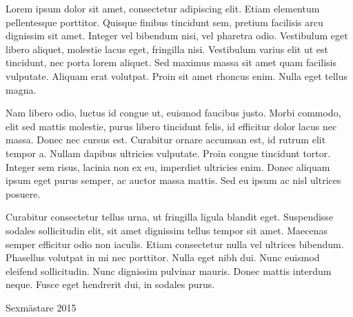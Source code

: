 \documentclass[../_main/handlingar.tex]{subfiles}
\begin{document}

Lorem ipsum dolor sit amet, consectetur adipiscing elit. Etiam elementum pellentesque porttitor. Quisque finibus tincidunt sem, pretium facilisis arcu dignissim sit amet. Integer vel bibendum nisi, vel pharetra odio. Vestibulum eget libero aliquet, molestie lacus eget, fringilla nisi. Vestibulum varius elit ut est tincidunt, nec porta lorem aliquet. Sed maximus massa sit amet quam facilisis vulputate. Aliquam erat volutpat. Proin sit amet rhoncus enim. Nulla eget tellus magna.

Nam libero odio, luctus id congue ut, euismod faucibus justo. Morbi commodo, elit sed mattis molestie, purus libero tincidunt felis, id efficitur dolor lacus nec massa. Donec nec cursus est. Curabitur ornare accumsan est, id rutrum elit tempor a. Nullam dapibus ultricies vulputate. Proin congue tincidunt tortor. Integer sem risus, lacinia non ex eu, imperdiet ultricies enim. Donec aliquam ipsum eget purus semper, ac auctor massa mattis. Sed eu ipsum ac nisl ultrices posuere.

Curabitur consectetur tellus urna, ut fringilla ligula blandit eget. Suspendisse sodales sollicitudin elit, sit amet dignissim tellus tempor sit amet. Maecenas semper efficitur odio non iaculis. Etiam consectetur nulla vel ultrices bibendum. Phasellus volutpat in mi nec porttitor. Nulla eget nibh dui. Nunc euismod eleifend sollicitudin. Nunc dignissim pulvinar mauris. Donec mattis interdum neque. Fusce eget hendrerit dui, in sodales purus.

\begin{signatures}{1}
    \mvh
    \signature{Adam Waks}{Sexmästare 2015}
\end{signatures}
\end{document}
